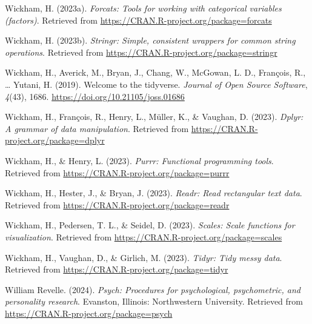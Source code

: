 \documentclass[
  man]{apa6}
\newlength{\cslhangindent}
\newlength{\cslentryspacingunit} %
\newenvironment{CSLReferences}[2] %
 {%
  \setlength{\parindent}{0pt}
  \ifodd #1
  \let\oldpar\par
  \def\par{\hangindent=\cslhangindent\oldpar}
  \fi
  \setlength{\parskip}{#2\cslentryspacingunit}
 }%
 {}
\begin{document}
\begin{CSLReferences}{1}{0}
\leavevmode{}%
Wickham, H. (2023a). \emph{Forcats: Tools for working with categorical variables (factors)}. Retrieved from \url{https://CRAN.R-project.org/package=forcats}

\leavevmode{}%
Wickham, H. (2023b). \emph{Stringr: Simple, consistent wrappers for common string operations}. Retrieved from \url{https://CRAN.R-project.org/package=stringr}

\leavevmode{}%
Wickham, H., Averick, M., Bryan, J., Chang, W., McGowan, L. D., François, R., \ldots{} Yutani, H. (2019). Welcome to the {tidyverse}. \emph{Journal of Open Source Software}, \emph{4}(43), 1686. \url{https://doi.org/10.21105/joss.01686}

\leavevmode{}%
Wickham, H., François, R., Henry, L., Müller, K., \& Vaughan, D. (2023). \emph{Dplyr: A grammar of data manipulation}. Retrieved from \url{https://CRAN.R-project.org/package=dplyr}

\leavevmode{}%
Wickham, H., \& Henry, L. (2023). \emph{Purrr: Functional programming tools}. Retrieved from \url{https://CRAN.R-project.org/package=purrr}

\leavevmode{}%
Wickham, H., Hester, J., \& Bryan, J. (2023). \emph{Readr: Read rectangular text data}. Retrieved from \url{https://CRAN.R-project.org/package=readr}

\leavevmode{}%
Wickham, H., Pedersen, T. L., \& Seidel, D. (2023). \emph{Scales: Scale functions for visualization}. Retrieved from \url{https://CRAN.R-project.org/package=scales}

\leavevmode{}%
Wickham, H., Vaughan, D., \& Girlich, M. (2023). \emph{Tidyr: Tidy messy data}. Retrieved from \url{https://CRAN.R-project.org/package=tidyr}

\leavevmode{}%
William Revelle. (2024). \emph{Psych: Procedures for psychological, psychometric, and personality research}. Evanston, Illinois: Northwestern University. Retrieved from \url{https://CRAN.R-project.org/package=psych}

\end{CSLReferences}
\end{document}
